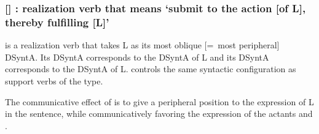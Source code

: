 \subsubsection*{{\small []}  : realization verb that means `submit to the action [of L], thereby fulfilling [L]'}\label{lf:Labreal-ij}

 is a realization verb that takes L as its most oblique [=~most peripheral] DSyntA. Its DSyntA\thinspace{} corresponds to the DSyntA\thinspace{} of L and its DSyntA\thinspace{} corresponds to the DSyntA\thinspace{} of L.  controls the same syntactic configuration as support verbs of the  type.

The communicative effect of  is to give a peripheral position to the expression of L in the sentence, while communicatively favoring the expression of the actants  and .

